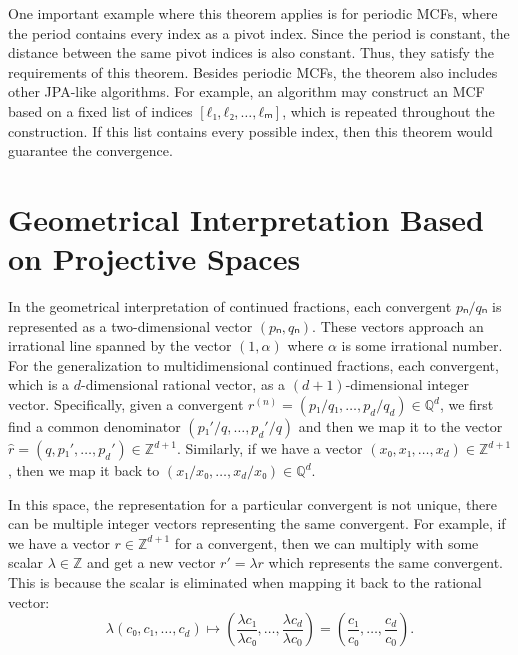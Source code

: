 One important example where this theorem applies is for periodic MCFs,
where the period contains every index as a pivot index.
Since the period is constant,
the distance between the same pivot indices is also constant.
Thus, they satisfy the requirements of this theorem.
Besides periodic MCFs, the theorem also includes other JPA-like algorithms.
For example, an algorithm may construct an MCF based on a fixed list of indices $[ℓ₁, ℓ₂, …, ℓₘ]$,
which is repeated throughout the construction.
If this list contains every possible index,
then this theorem would guarantee the convergence.

\section{Geometrical Interpretation Based on Projective Spaces}
\label{sec:mdcf-geometry}

In the geometrical interpretation of continued fractions,
each convergent $pₙ/qₙ$ is represented as a two-dimensional vector $(pₙ, qₙ)$.
These vectors approach an irrational line spanned by the vector $(1, α)$
where $α$ is some irrational number.
For the generalization to multidimensional continued fractions,
each convergent, which is a $d$-dimensional rational vector,
as a $(d+1)$-dimensional integer vector.
Specifically, given a convergent $r^{(n)} = (p₁/q₁, …, p_d/q_d) ∈ ℚ^d$,
we first find a common denominator $(p₁'/q, …, p_d'/q)$ and
then we map it to the vector $\hat r = (q, p₁', …, p_d') ∈ ℤ^{d+1}$.
Similarly, if we have a vector $(x₀, x₁, …, x_d) ∈ ℤ^{d+1}$,
then we map it back to $(x₁/x₀, …, x_d/x₀) ∈ ℚ^d$.

In this space, the representation for a particular convergent is not unique,
there can be multiple integer vectors representing the same convergent.
For example, if we have a vector $r ∈ ℤ^{d+1}$ for a convergent,
then we can multiply with some scalar $λ ∈ ℤ$ and get a new vector $r' = λ r$
which represents the same convergent.
This is because the scalar is eliminated when mapping it back to the rational vector:
\[
  λ (c₀, c₁, …, c_d)
  ↦ \left(\frac{λ c₁}{λ c₀}, …, \frac{λ c_d}{λ c_0} \right)
  = \left(\frac{c₁}{c₀}, …, \frac{c_d}{c_0} \right).
\]

